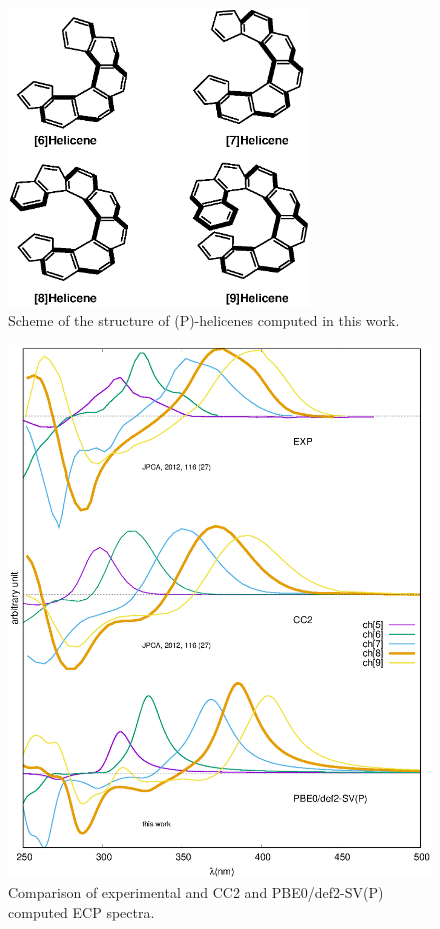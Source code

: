\documentclass[aip]{revtex4-1}
\begin{document}
\begin{figure}
\begin{center}
\includegraphics[width=8cm]{helicene.eps}
\end{center}
\vspace{0.25in}
\hspace*{3in}
\caption{Scheme of the structure of (P)-helicenes computed in this work.}
\label{fig:helicene}
\end{figure}
\begin{figure}
\begin{center}
\includegraphics[width=16cm]{comparison_EXP_CC2_DFT.eps}
\end{center}
\caption{\label{fig:comparison_EXP_CC2_DFT} 
Comparison of experimental and CC2 and PBE0/def2-SV(P) computed ECP spectra.
}
\end{figure}
\end{document}
